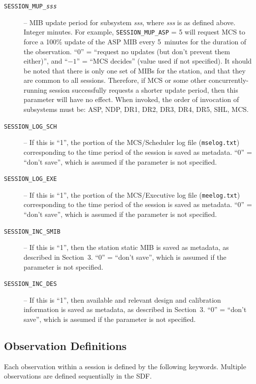 \begin{description}
\item[\texttt{SESSION\_MUP\_\textit{sss}}] -- MIB update period for subsystem \textit{sss}, where \textit{sss} is as defined above.  Integer minutes.  For example, \texttt{SESSION\_MUP\_ASP} = 5 will request MCS to force a 100\% update of the ASP MIB every 5~minutes for the duration of the observation.  ``0'' = ``request no updates (but don't prevent them either)'', and ``$-1$'' = ``MCS decides'' (value used if not specified).  It should be noted that there is only one set of MIBs for the station, and that they are common to all sessions.  Therefore, if MCS or some other concurrently-running session successfully requests a shorter update period, then this parameter will have no effect.  When invoked, the order of invocation of subsystems must be: ASP, NDP, DR1, DR2, DR3, DR4, DR5, SHL, MCS.

\item[\texttt{SESSION\_LOG\_SCH}] -- If this is ``1'', the portion of the MCS/Scheduler log file (\texttt{mselog.txt}) corresponding to the time period of the session is saved as metadata.  ``0'' = ``don't save'', which is assumed if the parameter is not specified.

\item[\texttt{SESSION\_LOG\_EXE}] -- If this is ``1'', the portion of the MCS/Executive log file (\texttt{meelog.txt}) corresponding to the time period of the session is saved as metadata.  ``0'' = ``don't save'', which is assumed if the parameter is not specified.

\item[\texttt{SESSION\_INC\_SMIB}] -- If this is ``1'', then the station static MIB is saved as metadata, as described in Section~3.  ``0'' = ``don't save'', which is assumed if the parameter is not specified.

\item[\texttt{SESSION\_INC\_DES}] -- If this is ``1'', then available and relevant design and calibration information is saved as metadata, as described in Section~3.  ``0'' = ``don't save'', which is assumed if the parameter is not specified.
\end{description}

\subsection{Observation Definitions}

Each observation within a session is defined by the following keywords.  Multiple observations are defined sequentially in the SDF.

